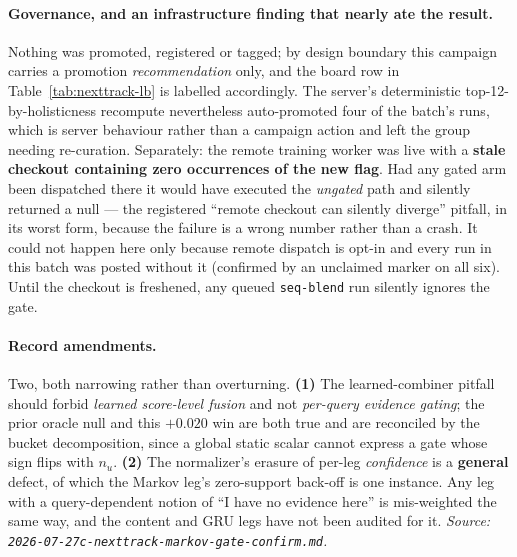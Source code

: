 \documentclass[11pt]{article}
\begin{document}
\paragraph{Governance, and an infrastructure finding that nearly ate the result.}
Nothing was promoted, registered or tagged; by design boundary this campaign
carries a promotion \emph{recommendation} only, and the board row in
Table~\ref{tab:nexttrack-lb} is labelled accordingly. The server's deterministic
top-12-by-holisticness recompute nevertheless auto-promoted four of the batch's
runs, which is server behaviour rather than a campaign action and left the group
needing re-curation. Separately: the remote training worker was live with a
\textbf{stale checkout containing zero occurrences of the new flag}. Had any gated
arm been dispatched there it would have executed the \emph{ungated} path and
silently returned a null --- the registered ``remote checkout can silently diverge''
pitfall, in its worst form, because the failure is a wrong number rather than a
crash. It could not happen here only because remote dispatch is opt-in and every
run in this batch was posted without it (confirmed by an unclaimed marker on all
six). Until the checkout is freshened, any queued \texttt{seq-blend} run silently
ignores the gate.

\paragraph{Record amendments.} Two, both narrowing rather than overturning.
\textbf{(1)} The learned-combiner pitfall should forbid \emph{learned score-level
fusion} and not \emph{per-query evidence gating}; the prior oracle null and this
$+\num{0.020}$ win are both true and are reconciled by the bucket decomposition,
since a global static scalar cannot express a gate whose sign flips with $n_u$.
\textbf{(2)} The normalizer's erasure of per-leg \emph{confidence} is a
\textbf{general} defect, of which the Markov leg's zero-support back-off is one
instance. Any leg with a query-dependent notion of ``I have no evidence here'' is
mis-weighted the same way, and the content and GRU legs have not been audited for
it.
\emph{Source: \texttt{2026-07-27c-nexttrack-markov-gate-confirm.md}.}
\end{document}
